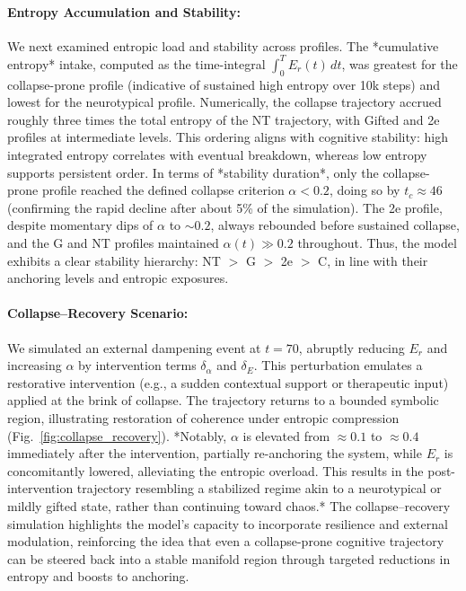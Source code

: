 \paragraph{Entropy Accumulation and Stability:} We next examined entropic load and stability across profiles. The *cumulative entropy* intake, computed as the time-integral $\int_0^T E_r(t)\,dt$, was greatest for the collapse-prone profile (indicative of sustained high entropy over 10k steps) and lowest for the neurotypical profile. Numerically, the collapse trajectory accrued roughly three times the total entropy of the NT trajectory, with Gifted and 2e profiles at intermediate levels. This ordering aligns with cognitive stability: high integrated entropy correlates with eventual breakdown, whereas low entropy supports persistent order. In terms of *stability duration*, only the collapse-prone profile reached the defined collapse criterion $\alpha < 0.2$, doing so by $t_c \approx 46$ (confirming the rapid decline after about 5\% of the simulation). The 2e profile, despite momentary dips of $\alpha$ to $\sim0.2$, always rebounded before sustained collapse, and the G and NT profiles maintained $\alpha(t)\gg0.2$ throughout. Thus, the model exhibits a clear stability hierarchy: NT $>$ G $>$ 2e $>$ C, in line with their anchoring levels and entropic exposures.

\paragraph{Collapse–Recovery Scenario:} We simulated an external dampening event at $t = 70$, abruptly reducing $E_r$ and increasing $\alpha$ by intervention terms $\delta_\alpha$ and $\delta_E$. This perturbation emulates a restorative intervention (e.g., a sudden contextual support or therapeutic input) applied at the brink of collapse. The trajectory returns to a bounded symbolic region, illustrating restoration of coherence under entropic compression (Fig.~\ref{fig:collapse_recovery}). *Notably, $\alpha$ is elevated from $\approx0.1$ to $\approx0.4$ immediately after the intervention, partially re-anchoring the system, while $E_r$ is concomitantly lowered, alleviating the entropic overload. This results in the post-intervention trajectory resembling a stabilized regime akin to a neurotypical or mildly gifted state, rather than continuing toward chaos.* The collapse–recovery simulation highlights the model’s capacity to incorporate resilience and external modulation, reinforcing the idea that even a collapse-prone cognitive trajectory can be steered back into a stable manifold region through targeted reductions in entropy and boosts to anchoring.

